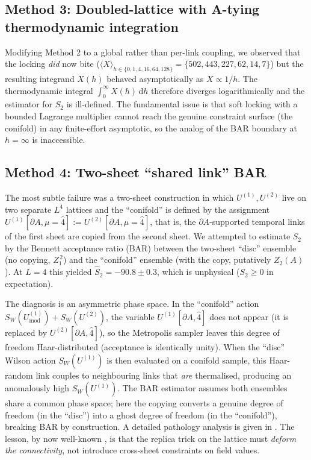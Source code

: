 \documentclass[11pt,a4paper]{article}
\theoremstyle{definition}
\newcommand{\dee}{\mathrm{d}}
\begin{document}
\subsection{Method 3: Doubled-lattice with A-tying thermodynamic integration}

Modifying Method 2 to a global rather than per-link coupling, we
observed that the locking \emph{did} now bite ($\langle X
\rangle_{h \in \{0,1,4,16,64,128\}} = \{502, 443, 227, 62, 14, 7\}$)
but the resulting integrand $X(h)$ behaved asymptotically as
$X \propto 1/h$. The thermodynamic integral
$\int_0^\infty X(h)\, \dee h$ therefore diverges logarithmically and
the estimator for $S_2$ is ill-defined. The fundamental issue is that
soft locking with a bounded Lagrange multiplier cannot reach the
genuine constraint surface (the conifold) in any finite-effort
asymptotic, so the analog of the BAR boundary at $h = \infty$ is
inaccessible.

\subsection{Method 4: Two-sheet ``shared link'' BAR}

The most subtle failure was a two-sheet construction in which
$U^{(1)}, U^{(2)}$ live on two separate $L^4$ lattices and the
``conifold'' is defined by the assignment $U^{(1)}[\partial A, \mu =
\hat 4] := U^{(2)}[\partial A, \mu = \hat 4]$, that is, the
$\partial A$-supported temporal links of the first sheet are copied
from the second sheet. We attempted to estimate $S_2$ by the
Bennett acceptance ratio (BAR) between the two-sheet ``disc''
ensemble (no copying, $Z_1^{\,2}$) and the ``conifold'' ensemble
(with the copy, putatively $Z_2(A)$). At $L = 4$ this yielded
$\widehat S_2 = -90.8 \pm 0.3$, which is unphysical
($S_2 \ge 0$ in expectation).

The diagnosis is an asymmetric phase space. In the ``conifold''
action $S_W(U^{(1)}_{\text{mod}}) + S_W(U^{(2)})$, the variable
$U^{(1)}[\partial A, \hat 4]$ does not appear (it is replaced by
$U^{(2)}[\partial A, \hat 4]$), so the Metropolis sampler leaves
this degree of freedom Haar-distributed (acceptance is identically
unity). When the ``disc'' Wilson action $S_W(U^{(1)})$ is then
evaluated on a conifold sample, this Haar-random link couples to
neighbouring links that \emph{are} thermalised, producing an
anomalously high $S_W(U^{(1)})$. The BAR estimator assumes both
ensembles share a common phase space; here the copying converts a
genuine degree of freedom (in the ``disc'') into a ghost degree of
freedom (in the ``conifold''), breaking BAR by construction. A
detailed pathology analysis is given in
\cite{KR2026,Rindlisbacher2022}. The lesson, by now well-known
\cite[\S 3]{Rindlisbacher2022}, is that the replica trick on the
lattice must \emph{deform the connectivity}, not introduce cross-sheet
constraints on field values.
\end{document}
